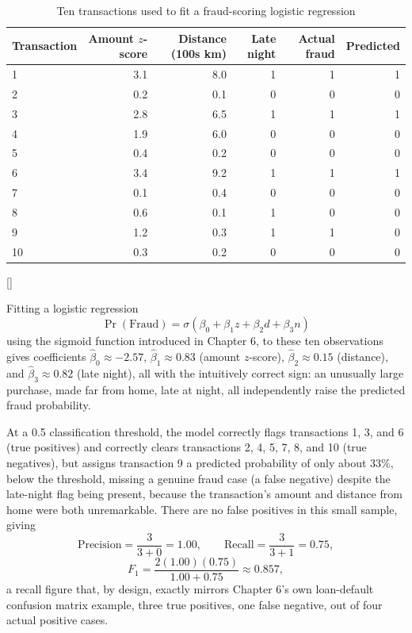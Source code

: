 \documentclass[../ai_in_finance]{subfiles}
\begin{document}
\begin{table}[htbp]
\centering
\begin{lrbox}{\bookmeasuredbox}
\begin{tabular}{lrrrrr}
\toprule
Transaction & Amount $z$-score & Distance (100s km) & Late night & Actual fraud & Predicted \\
\midrule
1 & 3.1 & 8.0 & 1 & 1 & 1 \\
2 & 0.2 & 0.1 & 0 & 0 & 0 \\
3 & 2.8 & 6.5 & 1 & 1 & 1 \\
4 & 1.9 & 6.0 & 0 & 0 & 0 \\
5 & 0.4 & 0.2 & 0 & 0 & 0 \\
6 & 3.4 & 9.2 & 1 & 1 & 1 \\
7 & 0.1 & 0.4 & 0 & 0 & 0 \\
8 & 0.6 & 0.1 & 1 & 0 & 0 \\
9 & 1.2 & 0.3 & 1 & 1 & 0 \\
10 & 0.3 & 0.2 & 0 & 0 & 0 \\
\bottomrule
\end{tabular}
\end{lrbox}
\ifdim\wd\bookmeasuredbox<0.65\linewidth
\setlength{\bookcapwidth}{0.65\linewidth}
\else
\setlength{\bookcapwidth}{\wd\bookmeasuredbox}
\fi
{}[\bookcapwidth]{
\usebox{\bookmeasuredbox}
}{
\caption{Ten transactions used to fit a fraud-scoring logistic regression}
\label{tab:fraud_scoring_data}
}
\end{table}

Fitting a logistic regression
$$\Pr(\text{Fraud}) = \sigma(\beta_0 + \beta_1 z + \beta_2 d + \beta_3 n)$$
using the sigmoid function introduced in Chapter 6, to these ten observations gives coefficients $\hat\beta_0 \approx -2.57$, $\hat\beta_1 \approx 0.83$ (amount $z$-score), $\hat\beta_2 \approx 0.15$ (distance), and $\hat\beta_3 \approx 0.82$ (late night), all with the intuitively correct sign: an unusually large purchase, made far from home, late at night, all independently raise the predicted fraud probability.

At a 0.5 classification threshold, the model correctly flags transactions 1, 3, and 6 (true positives) and correctly clears transactions 2, 4, 5, 7, 8, and 10 (true negatives), but assigns transaction 9 a predicted probability of only about $33\%$, below the threshold, missing a genuine fraud case (a false negative) despite the late-night flag being present, because the transaction's amount and distance from home were both unremarkable. There are no false positives in this small sample, giving
\begin{equation*}
\text{Precision} = \frac{3}{3+0} = 1.00, \qquad \text{Recall} = \frac{3}{3+1} = 0.75,
\end{equation*}
\begin{equation*}
 F_1 = \frac{2(1.00)(0.75)}{1.00+0.75} \approx 0.857,
\end{equation*}
a recall figure that, by design, exactly mirrors Chapter 6's own loan-default confusion matrix example, three true positives, one false negative, out of four actual positive cases.
\end{document}
